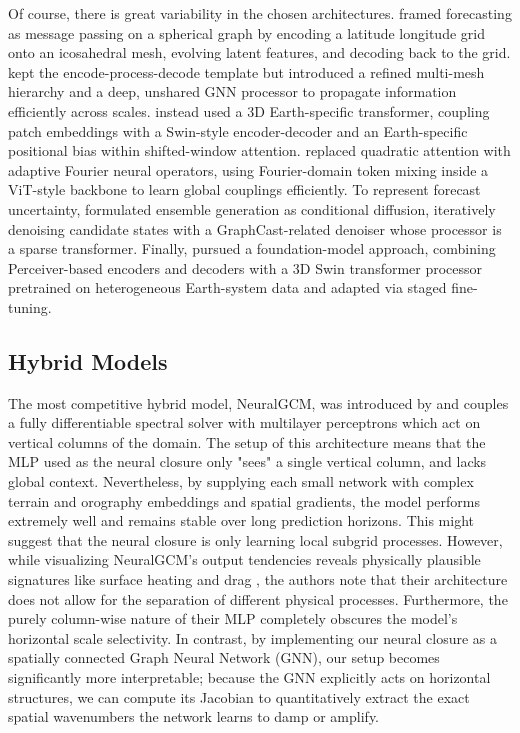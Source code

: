 Of course, there is great variability in the chosen architectures. 
\citet{keisler2022forecasting} framed forecasting as message passing on a spherical graph by encoding a latitude longitude grid onto an icosahedral mesh, evolving latent features, and decoding back to the grid. \citet{graphcast} kept the encode-process-decode template but introduced a refined multi-mesh hierarchy and a deep, unshared GNN processor to propagate information efficiently across scales. \citet{bi2022pangu} instead used a 3D Earth-specific transformer, coupling patch embeddings with a Swin-style encoder-decoder and an Earth-specific positional bias within shifted-window attention. \citet{fourcastnet} replaced quadratic attention with adaptive Fourier neural operators, using Fourier-domain token mixing inside a ViT-style backbone to learn global couplings efficiently. To represent forecast uncertainty, \citet{DBLP:journals/corr/abs-2312-15796} formulated ensemble generation as conditional diffusion, iteratively denoising candidate states with a GraphCast-related denoiser whose processor is a sparse transformer. Finally, \citet{aurora} pursued a foundation-model approach, combining Perceiver-based encoders and decoders with a 3D Swin transformer processor pretrained on heterogeneous Earth-system data and adapted via staged fine-tuning.


\subsection{Hybrid Models}
The most competitive hybrid model, NeuralGCM, was introduced by \citet{neuralgcm} and couples a fully differentiable spectral solver with multilayer perceptrons which act on vertical columns of the domain. The setup of this architecture means that the MLP used as the neural closure only "sees" a single vertical column, and lacks global context. Nevertheless, by supplying each small network with complex terrain and orography embeddings and spatial gradients, the model performs extremely well and remains stable over long prediction horizons. This might suggest that the neural closure is only learning local subgrid processes. However, while visualizing NeuralGCM's output tendencies reveals physically plausible signatures like surface heating and drag , the authors note that their architecture does not allow for the separation of different physical processes. Furthermore, the purely column-wise nature of their MLP completely obscures the model's horizontal scale selectivity. In contrast, by implementing our neural closure as a spatially connected Graph Neural Network (GNN), our setup becomes significantly more interpretable; because the GNN explicitly acts on horizontal structures, we can compute its Jacobian to quantitatively extract the exact spatial wavenumbers the network learns to damp or amplify.
 
